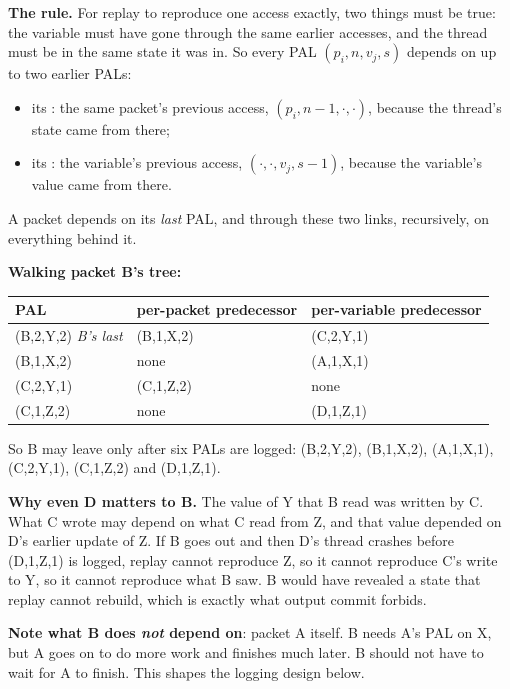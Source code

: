 \textbf{The rule.} For replay to reproduce one access exactly, two things must be true: the variable must have gone through the
same earlier accesses, and the thread must be in the same state it was in. So every PAL $(p_i, n, v_j, s)$ depends on up to two
earlier PALs:
\begin{itemize}
  \item its : the same packet's previous access, $(p_i, n-1, \cdot, \cdot)$, because the thread's state
        came from there;
  \item its : the variable's previous access, $(\cdot, \cdot, v_j, s-1)$, because the variable's value
        came from there.
\end{itemize}
A packet depends on its \emph{last} PAL, and through these two links, recursively, on everything behind it.

\textbf{Walking packet B's tree:}
\begin{center}
\begin{tabular}{@{}lll@{}}
\toprule
PAL & per-packet predecessor & per-variable predecessor\\
\midrule
(B,2,Y,2) \emph{B's last} & (B,1,X,2) & (C,2,Y,1)\\
(B,1,X,2) & none & (A,1,X,1)\\
(C,2,Y,1) & (C,1,Z,2) & none\\
(C,1,Z,2) & none & (D,1,Z,1)\\
\bottomrule
\end{tabular}
\end{center}
So B may leave only after six PALs are logged: (B,2,Y,2), (B,1,X,2), (A,1,X,1), (C,2,Y,1), (C,1,Z,2) and (D,1,Z,1).

\textbf{Why even D matters to B.} The value of Y that B read was written by C. What C wrote may depend on what C read from Z, and
that value depended on D's earlier update of Z. If B goes out and then D's thread crashes before (D,1,Z,1) is logged, replay
cannot reproduce Z, so it cannot reproduce C's write to Y, so it cannot reproduce what B saw. B would have revealed a state that
replay cannot rebuild, which is exactly what output commit forbids.

\textbf{Note what B does \emph{not} depend on}: packet A itself. B needs A's PAL on X, but A goes on to do more work and finishes
much later. B should not have to wait for A to finish. This shapes the logging design below.

